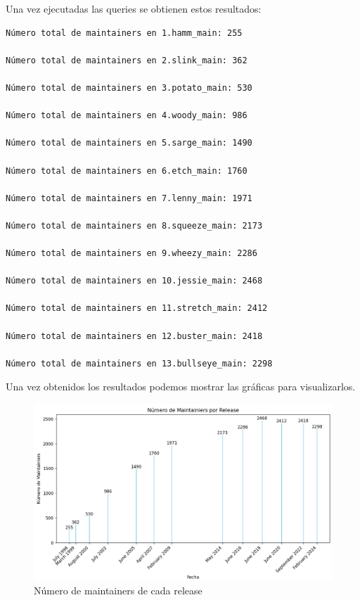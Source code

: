 \documentclass[a4paper, 12pt]{book}
\begin{document}
Una vez ejecutadas las queries se obtienen estos resultados:
\begin{verbatim}
Número total de maintainers en 1.hamm_main: 255

Número total de maintainers en 2.slink_main: 362

Número total de maintainers en 3.potato_main: 530

Número total de maintainers en 4.woody_main: 986

Número total de maintainers en 5.sarge_main: 1490

Número total de maintainers en 6.etch_main: 1760

Número total de maintainers en 7.lenny_main: 1971

Número total de maintainers en 8.squeeze_main: 2173

Número total de maintainers en 9.wheezy_main: 2286

Número total de maintainers en 10.jessie_main: 2468

Número total de maintainers en 11.stretch_main: 2412

Número total de maintainers en 12.buster_main: 2418

Número total de maintainers en 13.bullseye_main: 2298

\end{verbatim} 



Una vez obtenidos los resultados podemos mostrar las gráficas para visualizarlos.
\begin{figure}[h]
	\centering
	\includegraphics[width=15cm, keepaspectratio]{img/Figura2_buena_maintainers.png}
	\caption{Número de maintainers de cada release}
	\label{fig:mantenedores}
\end{figure}
\end{document}
